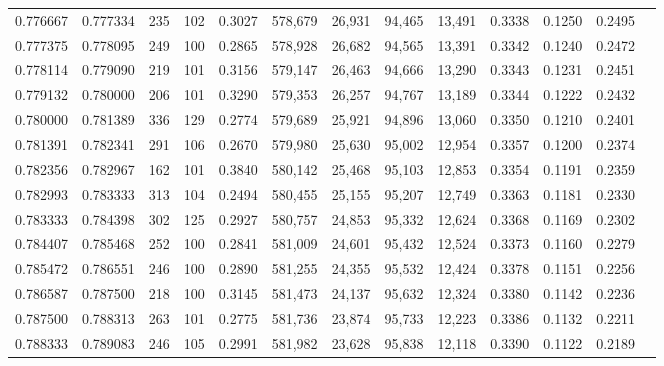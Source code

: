 \begin{tabular}{rrrrrrrrrrrrr}
0.776667 & 0.777334 &    235 &   102 &                                     0.3027 & 578,679 &  26,931 &  94,465 &  13,491 & 0.3338 & 0.1250 & 0.2495 \\
0.777375 & 0.778095 &    249 &   100 &                                     0.2865 & 578,928 &  26,682 &  94,565 &  13,391 & 0.3342 & 0.1240 & 0.2472 \\
0.778114 & 0.779090 &    219 &   101 &                                     0.3156 & 579,147 &  26,463 &  94,666 &  13,290 & 0.3343 & 0.1231 & 0.2451 \\
0.779132 & 0.780000 &    206 &   101 &                                     0.3290 & 579,353 &  26,257 &  94,767 &  13,189 & 0.3344 & 0.1222 & 0.2432 \\
0.780000 & 0.781389 &    336 &   129 &                                     0.2774 & 579,689 &  25,921 &  94,896 &  13,060 & 0.3350 & 0.1210 & 0.2401 \\
0.781391 & 0.782341 &    291 &   106 &                                     0.2670 & 579,980 &  25,630 &  95,002 &  12,954 & 0.3357 & 0.1200 & 0.2374 \\
0.782356 & 0.782967 &    162 &   101 &                                     0.3840 & 580,142 &  25,468 &  95,103 &  12,853 & 0.3354 & 0.1191 & 0.2359 \\
0.782993 & 0.783333 &    313 &   104 &                                     0.2494 & 580,455 &  25,155 &  95,207 &  12,749 & 0.3363 & 0.1181 & 0.2330 \\
0.783333 & 0.784398 &    302 &   125 &                                     0.2927 & 580,757 &  24,853 &  95,332 &  12,624 & 0.3368 & 0.1169 & 0.2302 \\
0.784407 & 0.785468 &    252 &   100 &                                     0.2841 & 581,009 &  24,601 &  95,432 &  12,524 & 0.3373 & 0.1160 & 0.2279 \\
0.785472 & 0.786551 &    246 &   100 &                                     0.2890 & 581,255 &  24,355 &  95,532 &  12,424 & 0.3378 & 0.1151 & 0.2256 \\
0.786587 & 0.787500 &    218 &   100 &                                     0.3145 & 581,473 &  24,137 &  95,632 &  12,324 & 0.3380 & 0.1142 & 0.2236 \\
0.787500 & 0.788313 &    263 &   101 &                                     0.2775 & 581,736 &  23,874 &  95,733 &  12,223 & 0.3386 & 0.1132 & 0.2211 \\
0.788333 & 0.789083 &    246 &   105 &                                     0.2991 & 581,982 &  23,628 &  95,838 &  12,118 & 0.3390 & 0.1122 & 0.2189 \\

\end{tabular}
